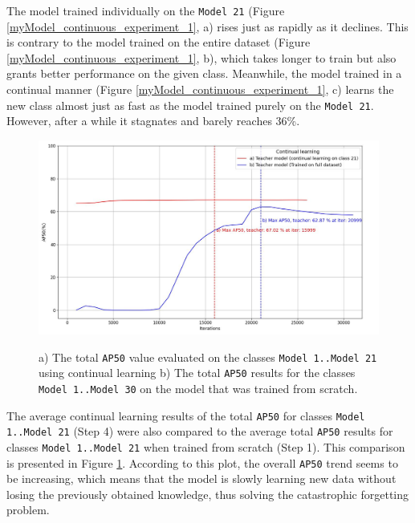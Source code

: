 The model trained individually on the \texttt{Model 21} (Figure \ref{myModel_continuous_experiment_1}, a)  rises just as rapidly as it declines. This is contrary to the model trained on the entire dataset (Figure \ref{myModel_continuous_experiment_1}, b), which takes longer to train but also grants better performance on the given class. Meanwhile, the model trained in a continual manner (Figure \ref{myModel_continuous_experiment_1}, c) learns the new class almost just as fast as the model trained purely on the \texttt{Model 21}. However, after a while it stagnates and barely reaches 36\%. 


\begin{figure}[htb]
	\begin{center}
		\includegraphics[width=14cm]{./AP50_continual_21_allClasses.jpg}
	\end{center}
	\caption{a) The total \texttt{AP50} value evaluated on the classes \texttt{Model 1..Model 21} using continual learning b) The total \texttt{AP50} results for the classes \texttt{Model 1..Model 30} on the model that was trained from scratch.}
	\begin{center}
	\label{myModel_continuous_experiment_0}
	\end{center}
\end{figure}
\FloatBarrier

The average continual learning results of the total \texttt{AP50} for classes \texttt{Model 1..Model 21} (Step 4) were also compared to the average total \texttt{AP50} results for classes \texttt{Model 1..Model 21} when trained from scratch (Step 1). This comparison is presented in Figure \ref{myModel_continuous_experiment_0}. According to this plot, the overall \texttt{AP50} trend seems to be increasing, which means that the model is slowly learning new data without losing the previously obtained knowledge, thus solving the catastrophic forgetting problem. 

